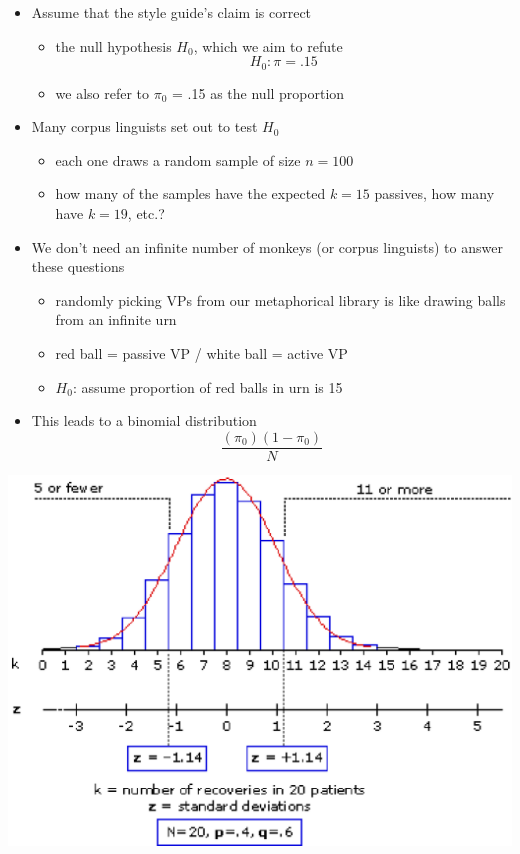 \documentclass[a4paper,landscape,headrule,footrule,xetex]{foils}
\begin{document}
\begin{itemize}
\item Assume that the style guide's claim is correct
\begin{itemize}
\item the null hypothesis $H_0$, which we aim to refute
\\ \[H_0:\pi = .15 \]
\item we also refer to $\pi_0$ = .15 as the null proportion
\end{itemize}
\item Many corpus linguists set out to test $H_0$
\begin{itemize}
\item each one draws a random sample of size $n = 100$
\item how many of the samples have the expected $k = 15$
passives, how many have $k = 19$, etc.?
\end{itemize}
\end{itemize}

\begin{itemize}
\item We don't need an infinite number of monkeys
(or corpus linguists) to answer these questions
\begin{itemize}
\item randomly picking VPs from our metaphorical library
is like drawing balls from an infinite urn
\item red ball = passive VP / white ball = active VP
\item $H_0$: assume proportion of red balls in urn is 15%
\end{itemize}
\item This leads to a binomial distribution
\[ \frac{(\pi_0)(1 - \pi_0)}{N} \]
\end{itemize}




\begin{center}
  \includegraphics[height=0.98\textheight]{include/binom.eps}
\end{center}
\end{document}
